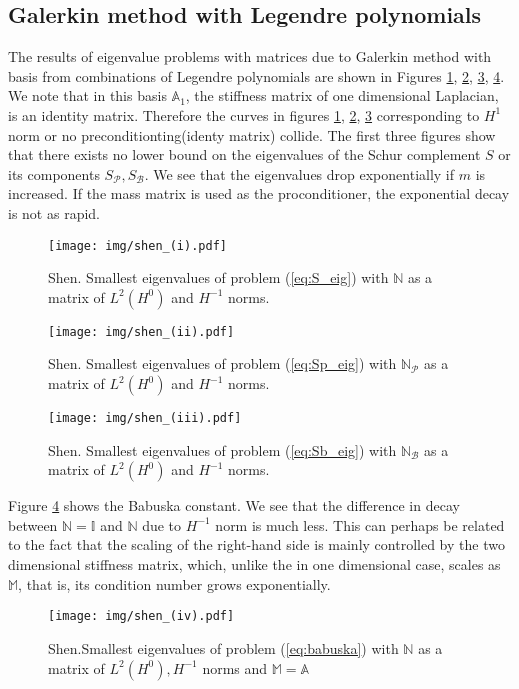 \documentclass[a4paper,10pt]{article}
\newcommand{\Amat}{\ensuremath{\mathbb{A}}}
\newcommand{\Mmat}{\ensuremath{\mathbb{M}}}
\newcommand{\Nmat}{\ensuremath{\mathbb{N}}}
\begin{document}
\subsection{Galerkin method with Legendre polynomials}
The results of eigenvalue problems with matrices due to Galerkin method 
with basis from combinations of Legendre polynomials are shown in Figures 
\ref{fig:pois_shen_1}, \ref{fig:pois_shen_2}, \ref{fig:pois_shen_3}, 
\ref{fig:pois_shen_4}. We note that in this basis $\Amat_1$, the stiffness matrix 
of one dimensional Laplacian, is an identity matrix. Therefore the curves
in figures \ref{fig:pois_shen_1}, \ref{fig:pois_shen_2}, \ref{fig:pois_shen_3}
corresponding to $H^{1}$ norm or no preconditionting(identy matrix) collide.
The first three figures show that there exists no lower bound on the eigenvalues
of the Schur complement $S$ or its components $S_\mathcal{P}, S_\mathcal{B}$.
We see that the eigenvalues drop exponentially if $m$ is increased. If the mass
matrix is used as the proconditioner, the exponential decay is not as rapid.
\begin{figure}
  \begin{center}
    \texttt{[image: img/shen\_(i).pdf]}
  \caption{Shen. Smallest eigenvalues of problem (\ref{eq:S_eig}) with $\Nmat$ as
  a matrix of $L^2(H^0)$ and $H^{-1}$ norms.}
  \label{fig:pois_shen_1}
  \end{center}
\end{figure}
\begin{figure}
  \begin{center}
    \texttt{[image: img/shen\_(ii).pdf]}
  \caption{Shen. Smallest eigenvalues of problem (\ref{eq:Sp_eig}) with
    $\Nmat_\mathcal{P}$ as a matrix of $L^2(H^0)$ and $H^{-1}$ norms.}
  \label{fig:pois_shen_2}
  \end{center}
\end{figure}
\begin{figure}
  \begin{center}
    \texttt{[image: img/shen\_(iii).pdf]}
  \caption{Shen. Smallest eigenvalues of problem (\ref{eq:Sb_eig}) with
    $\Nmat_\mathcal{B}$ as a matrix of $L^2(H^0)$ and $H^{-1}$ norms.}
  \label{fig:pois_shen_3}
  \end{center}
\end{figure}
Figure \ref{fig:pois_shen_4} shows the Babuska constant. We see that the
difference in decay between $\Nmat=\mathbb{I}$ and $\Nmat$ due to $H^{-1}$
norm is much less. This can perhaps be related to the fact that the scaling
of the right-hand side is mainly controlled by the two dimensional stiffness
matrix, which, unlike the in one dimensional case, scales as $\Mmat$, that is,
its condition number grows exponentially.
\begin{figure}
  \begin{center}
    \texttt{[image: img/shen\_(iv).pdf]}
    \caption{Shen.Smallest eigenvalues of problem (\ref{eq:babuska}) with $\Nmat$ as
    a matrix of $L^2(H^0), H^{-1}$ norms and $\Mmat=\Amat$}
  \label{fig:pois_shen_4}
  \end{center}
\end{figure}
\end{document}
